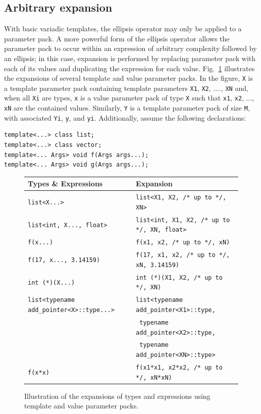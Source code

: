 \documentclass{article}
\begin{document}
\subsection{Arbitrary expansion}
With basic variadic templates, the ellipsis operator may only be
applied to a parameter pack. A more powerful form of the ellipsis
operator allows the parameter pack to occur within an expression of
arbitrary complexity followed by an ellipsis; in this case, expansion
is performed by replacing parameter pack with each of its values and
duplicating the expression for each value. Fig.~\ref{fig:expansions}
illustrates the expansions of several template and value parameter
packs. In the figure, \texttt{X} is a template parameter pack
containing template parameters \texttt{X1}, \texttt{X2}, ....,
\texttt{XN} and, when all \texttt{Xi} are types, \texttt{x} is a value
parameter pack of type \texttt{X} such that \texttt{x1}, \texttt{x2},
..., \texttt{xN} are the contained values. Similarly, \texttt{Y} is a
template parameter pack of size \texttt{M}, with associated
\texttt{Yi}, \texttt{y}, and \texttt{yi}. Additionally, assume the
following declarations:
\begin{verbatim}
template<...> class list;
template<...> class vector;
template<... Args> void f(Args args...);
template<... Args> void g(Args args...);
\end{verbatim}

\begin{figure}[h]
\centering
\begin{tabular}{l|l}
\textbf{Types \& Expressions} & \textbf{Expansion} \\\hline
\texttt{list<X...>} & \texttt{list<X1, X2, /* up to */, XN>} \\
\texttt{list<int, X..., float>} & \texttt{list<int, X1, X2, /* up to */, XN,
  float>} \\
\texttt{f(x...)} & \texttt{f(x1, x2, /* up to */, xN)} \\
\texttt{f(17, x..., 3.14159)} & \texttt{f(17, x1, x2, /* up to */, xN,
  3.14159)} \\
\texttt{int (*)(X...)} & \texttt{int (*)(X1, X2, /* up to */, XN)} \\
\texttt{list<typename add\_pointer<X>::type...>} &
\texttt{list<typename add\_pointer<X1>::type,} \\
& \qquad\texttt{{ }typename add\_pointer<X2>::type,} \\
& \qquad\texttt{{ }typename add\_pointer<XN>::type>} \\

\texttt{f(x*x)} & \texttt{f(x1*x1, x2*x2, /* up to */, xN*xN)} \\
\end{tabular}
\caption{Illustration of the expansions of types and
  expressions using template and value parameter packs.}
\label{fig:expansions}
\end{figure}
\end{document}
